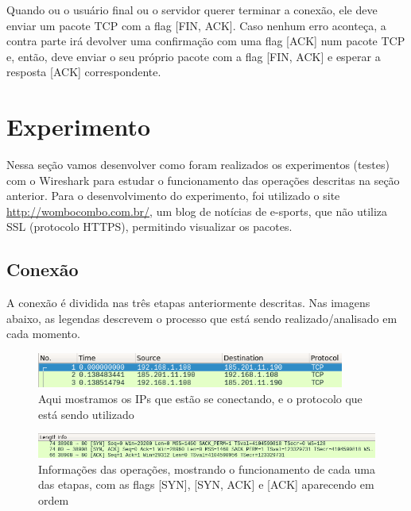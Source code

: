 \documentclass{article}
\begin{document}
Quando ou o usuário final ou o servidor querer terminar a conexão, ele deve enviar um pacote TCP com a flag [FIN, ACK]. Caso nenhum erro aconteça, a contra parte irá devolver uma confirmação com uma flag [ACK] num pacote TCP e, então, deve enviar o seu próprio pacote com a flag [FIN, ACK] e esperar a resposta [ACK] correspondente.

\section{Experimento}

Nessa seção vamos desenvolver como foram realizados os experimentos (testes) com o Wireshark para estudar o funcionamento das operações descritas na seção anterior. Para o desenvolvimento do experimento, foi utilizado o site \href{http://wombocombo.com.br/}{http://wombocombo.com.br/}, um blog de notícias de e-sports, que não utiliza SSL (protocolo HTTPS), permitindo visualizar os pacotes. 

\subsection{Conexão}

A conexão é dividida nas três etapas anteriormente descritas. Nas imagens abaixo, as legendas descrevem o processo que está sendo realizado/analisado em cada momento.

\begin{figure}[h]
    \centering
    \includegraphics[width=0.9\textwidth]{images/conect1.png}
    \caption{Aqui mostramos os IPs que estão se conectando, e o protocolo que está sendo utilizado}
    \label{fig:conect1}
\end{figure}{}

\begin{figure}[h]
    \centering
    \includegraphics[width=\textwidth]{images/conect2.png}
    \caption{Informações das operações, mostrando o funcionamento de cada uma das etapas, com as flags [SYN], [SYN, ACK] e [ACK] aparecendo em ordem}
    \label{fig:conect2}
\end{figure}{}
\end{document}
